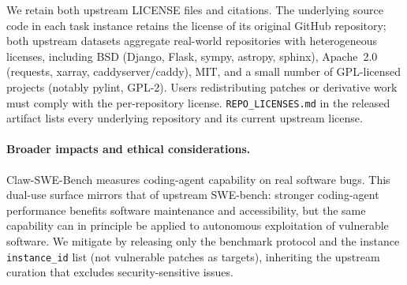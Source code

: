 \documentclass{llmxive}
\begin{document}
We retain both upstream LICENSE files and citations. The underlying source
code in each task instance retains the license of its original GitHub
repository; both upstream datasets aggregate real-world repositories with
heterogeneous licenses, including BSD (Django, Flask, sympy, astropy,
sphinx), Apache~2.0 (requests, xarray, caddyserver/caddy), MIT, and a
small number of GPL-licensed projects (notably pylint, GPL-2). Users
redistributing patches or derivative work must comply with the
per-repository license. \texttt{REPO\_LICENSES.md} in the released artifact
lists every underlying repository and its current upstream license.


\paragraph{Broader impacts and ethical considerations.}
Claw-SWE-Bench measures coding-agent capability on real software bugs.
This dual-use surface mirrors that of upstream SWE-bench: stronger
coding-agent performance benefits software maintenance and accessibility,
but the same capability can in principle be applied to autonomous
exploitation of vulnerable software. We mitigate by releasing only the
benchmark protocol and the instance \texttt{instance\_id} list (not
vulnerable patches as targets), inheriting the upstream curation that
excludes security-sensitive issues.

\end{document}
